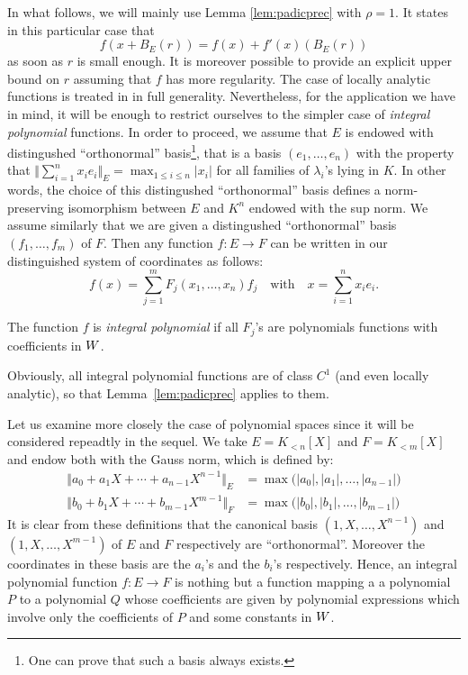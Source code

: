 \documentclass{article}
\begin{document}
In what follows, we will mainly use Lemma \ref{lem:padicprec} with
$\rho = 1$. It states in this particular case that 
\begin{equation}
\label{eq:padicprec2}
f(x + B_E(r)) = f(x) + f'(x)(B_E(r))
\end{equation}
as soon as $r$ is small enough. It is moreover possible to provide
an explicit upper bound on $r$ assuming that $f$ has more regularity.
The case of locally analytic functions is treated in \cite{padicprec}
in full generality. Nevertheless, for the application we have in mind, 
it will be enough to restrict ourselves to the simpler case of 
\emph{integral polynomial} functions. In order to proceed, we assume 
that $E$ is endowed with distingushed ``orthonormal'' 
basis\footnote{One can prove that such a basis always exists.}, that is 
a basis $(e_1, \ldots, e_n)$ with the property that $\Vert \sum_{i=1}^n 
x_i e_i \Vert_E = \max_{1\leq i \leq n} |x_i|$ for all 
families of $\lambda_i$'s lying in $K$. In other words, the choice of
this distingushed ``orthonormal'' basis defines a norm-preserving 
isomorphism between $E$ and $K^n$ endowed with the sup norm. We assume
similarly that we are given a distingushed ``orthonormal'' basis
$(f_1, \ldots, f_m)$ of $F$. Then any function $f : E \to F$ can
be written in our distinguished system of coordinates as follows:
$$f(x) = \sum_{j=1}^m F_j(x_1, \ldots, x_n) f_j
\quad \text{with} \quad x = \sum_{i=1}^n x_i e_i.$$

\begin{deftn}
The function $f$ is \emph{integral polynomial} if all $F_j$'s are
polynomials functions with coefficients in $W$.
\end{deftn}

Obviously, all integral polynomial functions are of class $C^1$ (and
even locally analytic), so that Lemma~\ref{lem:padicprec} applies to 
them.

\begin{ex}
Let us examine more closely the case of polynomial spaces since it will 
be considered repeadtly in the sequel. We take $E = K_{<n}[X]$ and $F = 
K_{<m}[X]$ and endow both with the Gauss norm, which is defined by:
\begin{align*}
\Vert a_0 + a_1 X + \cdots + a_{n-1} X^{n-1} \Vert_E & 
  = \max \big(|a_0|, |a_1|, \ldots, |a_{n-1}|\big) \\
\Vert b_0 + b_1 X + \cdots + b_{m-1} X^{m-1} \Vert_F & 
  = \max \big(|b_0|, |b_1|, \ldots, |b_{m-1}|\big)
\end{align*}
It is clear from these definitions that the canonical basis $(1, X, 
\ldots, X^{n-1})$ and $(1, X, \ldots, X^{m-1})$ of $E$ and $F$ 
respectively are ``orthonormal''. Moreover the coordinates in these
basis are the $a_i$'s and the $b_i$'s respectively. Hence, an integral
polynomial function $f : E \to F$ is nothing but a function mapping a
a polynomial $P$ to a polynomial $Q$ whose coefficients are given by
polynomial expressions which involve only the coefficients of $P$ and 
some constants in $W$.
\end{ex}
\end{document}
